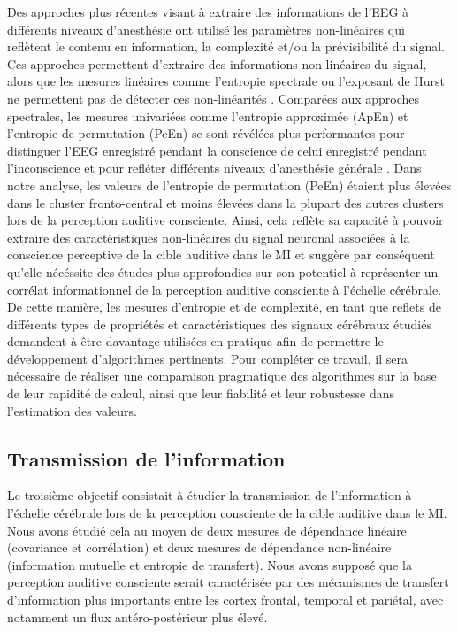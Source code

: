 Des approches plus récentes visant à extraire des informations de l'EEG à différents niveaux d'anesthésie ont utilisé les paramètres non-linéaires qui reflètent le contenu en information, la complexité et/ou la prévisibilité du signal. 
Ces approches permettent d'extraire des informations non-linéaires du signal, alors que les mesures linéaires comme l'entropie spectrale ou l'exposant de Hurst ne permettent pas de détecter ces non-linéarités \citep{anier2010entropy, jordan2009detection, kreuzer2017eeg}. 
Comparées aux approches spectrales, les mesures univariées comme l'entropie approximée (ApEn) et l'entropie de permutation (PeEn) se sont révélées plus performantes pour distinguer l'EEG enregistré pendant la conscience de celui enregistré pendant l'inconscience et pour refléter différents niveaux d'anesthésie générale \citep{bruhn2000approximate, jordan2008electroencephalographic, liang2015eeg}. 
Dans notre analyse, les valeurs de l'entropie de permutation (PeEn) étaient plus élevées dans le cluster fronto-central et moins élevées dans la plupart des autres clusters lors de la perception auditive consciente. 
Ainsi, cela reflète sa capacité à pouvoir extraire des caractéristiques non-linéaires du signal neuronal associées à la conscience perceptive de la cible auditive dans le MI et suggère par conséquent qu'elle nécéssite des études plus approfondies sur son potentiel à représenter un corrélat informationnel de la perception auditive consciente à l'échelle cérébrale. 
De cette manière, les mesures d'entropie et de complexité, en tant que reflets de différents types de propriétés et caractéristiques des signaux cérébraux étudiés demandent à être davantage utilisées en pratique afin de permettre le développement d'algorithmes pertinents. 
Pour compléter ce travail, il sera nécessaire de réaliser une comparaison pragmatique des algorithmes sur la base de leur rapidité de calcul, ainsi que leur fiabilité et leur robustesse dans l'estimation des valeurs.

\subsection{Transmission de l'information}

Le troisième objectif consistait à étudier la transmission de l'information à l'échelle cérébrale lors de la perception consciente de la cible auditive dans le MI. 
Nous avons étudié cela au moyen de deux mesures de dépendance linéaire (covariance et corrélation) et deux mesures de dépendance non-linéaire (information mutuelle et entropie de transfert). 
Nous avons supposé que la perception auditive consciente serait caractérisée par des mécanismes de transfert d'information plus importants entre les cortex frontal, temporal et pariétal, avec notamment un flux antéro-postérieur plus élevé. 

